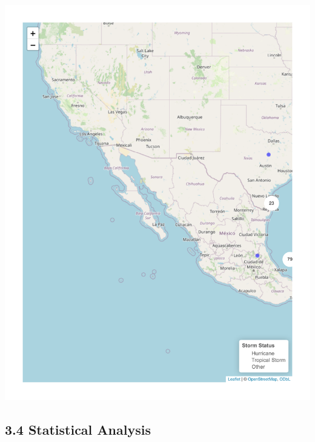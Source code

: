 \documentclass[12pt,letterpaper]{article}
\begin{document}
\includegraphics{GroupTask3_files/figure-pdf/LeafletMap-1.pdf}

\subsection{3.4 Statistical Analysis}\label{statistical-analysis}
\end{document}
